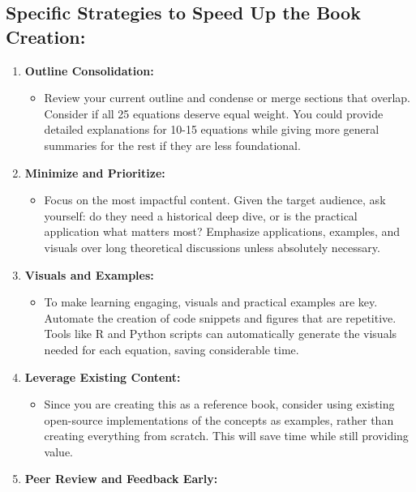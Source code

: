 \documentclass[
  12 pt,
  a4paper,
]{book}
\providecommand{\tightlist}{%
  \setlength{\itemsep}{0pt}\setlength{\parskip}{0pt}}
\numberwithin{equation}{section}
\theoremstyle{plain}      %
\theoremstyle{definition} %
\theoremstyle{remark}     %
\theoremstyle{note}         %
\begin{document}
\hypertarget{specific-strategies-to-speed-up-the-book-creation}{%
\subsection*{\texorpdfstring{\textbf{Specific Strategies to Speed Up the
Book
Creation:}}{Specific Strategies to Speed Up the Book Creation:}}\label{specific-strategies-to-speed-up-the-book-creation}}

\begin{enumerate}
\def\labelenumi{\arabic{enumi}.}
\tightlist
\item
  \textbf{Outline Consolidation:}

  \begin{itemize}
  \tightlist
  \item
    Review your current outline and condense or merge sections that
    overlap. Consider if all 25 equations deserve equal weight. You
    could provide detailed explanations for 10-15 equations while giving
    more general summaries for the rest if they are less foundational.
  \end{itemize}
\item
  \textbf{Minimize and Prioritize:}

  \begin{itemize}
  \tightlist
  \item
    Focus on the most impactful content. Given the target audience, ask
    yourself: do they need a historical deep dive, or is the practical
    application what matters most? Emphasize applications, examples, and
    visuals over long theoretical discussions unless absolutely
    necessary.
  \end{itemize}
\item
  \textbf{Visuals and Examples:}

  \begin{itemize}
  \tightlist
  \item
    To make learning engaging, visuals and practical examples are key.
    Automate the creation of code snippets and figures that are
    repetitive. Tools like R and Python scripts can automatically
    generate the visuals needed for each equation, saving considerable
    time.
  \end{itemize}
\item
  \textbf{Leverage Existing Content:}

  \begin{itemize}
  \tightlist
  \item
    Since you are creating this as a reference book, consider using
    existing open-source implementations of the concepts as examples,
    rather than creating everything from scratch. This will save time
    while still providing value.
  \end{itemize}
\item
  \textbf{Peer Review and Feedback Early:}


\end{enumerate}
\end{document}
